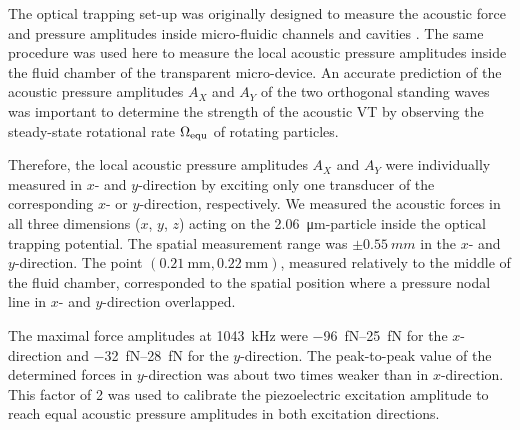 The optical trapping set-up was originally designed to measure the acoustic 
force and pressure amplitudes inside micro-fluidic channels and cavities 
\cite{Lakaemper2015,Lamprecht2016}. The same procedure was used here to measure 
the local acoustic pressure amplitudes inside the fluid chamber of the 
transparent micro-device. An accurate prediction of the acoustic pressure 
amplitudes $A_{X}$ and $A_{Y}$ of the two orthogonal standing waves was 
important to determine the strength of the acoustic VT by observing the 
steady-state rotational rate $\Omega_{\mathrm{equ}}$ of rotating particles.

Therefore, the local acoustic pressure amplitudes $A_{X}$ and $A_{Y}$ were 
individually measured in $x$- and $y$-direction by exciting only one transducer 
of the corresponding $x$- or $y$-direction, respectively. We measured the 
acoustic forces in all three dimensions ($x$, $y$, $z$) acting on the 
\SI{2.06}{\micro\meter}-particle inside the optical trapping potential. The 
spatial measurement range was $\pm \SI{0.55}{mm}$ in the $x$- and $y$-direction.  
The point $(\SI{0.21}{\mm}, \SI{0.22}{\mm})$, measured relatively to the middle 
of the fluid chamber, corresponded to the spatial position where a pressure 
nodal line in $x$- and $y$-direction overlapped.

The maximal force amplitudes at \SI{1043}{\kilo\hertz} were 
\SIrange{-96}{+25}{\femto\newton} for the $x$-direction and 
\SIrange{-32}{28}{\femto\newton} for the $y$-direction. The peak-to-peak value 
of the determined forces in $y$-direction was about two times weaker than in 
$x$-direction. This factor of 2 was used to calibrate the piezoelectric 
excitation amplitude to reach equal acoustic pressure amplitudes in both 
excitation directions.

